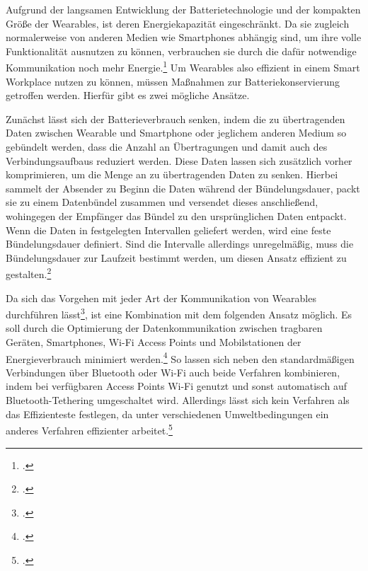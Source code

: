 Aufgrund der langsamen Entwicklung der Batterietechnologie und der kompakten Größe der Wearables, ist deren Energiekapazität eingeschränkt. Da sie zugleich normalerweise von anderen Medien wie Smartphones abhängig sind, um ihre volle Funktionalität ausnutzen zu können, verbrauchen sie durch die dafür notwendige Kommunikation noch mehr Energie.\footcite[Vgl.][Seite 33]{wearable1} Um Wearables also effizient in einem Smart Workplace nutzen zu können, müssen Maßnahmen zur Batteriekonservierung getroffen werden. Hierfür gibt es zwei mögliche Ansätze.

Zunächst lässt sich der Batterieverbrauch senken, indem die zu übertragenden Daten zwischen Wearable und Smartphone oder jeglichem anderen Medium so gebündelt werden, dass die Anzahl an Übertragungen und damit auch des Verbindungsaufbaus reduziert werden. Diese Daten lassen sich zusätzlich vorher komprimieren, um die Menge an zu übertragenden Daten zu senken. Hierbei sammelt der Absender zu Beginn die Daten während der Bündelungsdauer, packt sie zu einem Datenbündel zusammen und versendet dieses anschließend, wohingegen der Empfänger das Bündel zu den ursprünglichen Daten entpackt. Wenn die Daten in festgelegten Intervallen geliefert werden, wird eine feste Bündelungsdauer definiert. Sind die Intervalle allerdings unregelmäßig, muss die Bündelungsdauer zur Laufzeit bestimmt werden, um diesen Ansatz effizient zu gestalten.\footcite[Vgl.][Seite 76 f.]{wearable2}

Da sich das Vorgehen mit jeder Art der Kommunikation von Wearables durchführen lässt\footcite[Vgl.][Seite 77]{wearable2}, ist eine Kombination mit dem folgenden Ansatz möglich. Es soll durch die Optimierung der Datenkommunikation zwischen tragbaren Geräten, Smartphones, Wi-Fi Access Points und Mobilstationen der Energieverbrauch minimiert werden.\footcite[Vgl.][Seite 33]{wearable1} So lassen sich neben den standardmäßigen Verbindungen über Bluetooth oder Wi-Fi auch beide Verfahren kombinieren, indem bei verfügbaren Access Points Wi-Fi genutzt und sonst automatisch auf Bluetooth-Tethering umgeschaltet wird. Allerdings lässt sich kein Verfahren als das Effizienteste festlegen, da unter verschiedenen Umweltbedingungen ein anderes Verfahren effizienter arbeitet.\footcite[Vgl.][Seite 35]{wearable1}